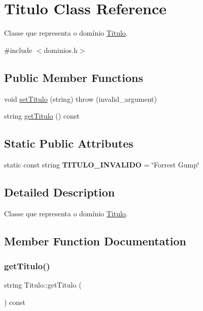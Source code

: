 \hypertarget{classTitulo}{}\section{Titulo Class Reference}
\label{classTitulo}


Classe que representa o domínio \hyperlink{classTitulo}{Titulo}.  




{\ttfamily \#include $<$dominios.\+h$>$}

\subsection*{Public Member Functions}
\begin{DoxyCompactItemize}
\item 
void \hyperlink{classTitulo_ac4b3e70d24f498a9085ae9d01d51ef12}{set\+Titulo} (string)  throw (invalid\+\_\+argument)
\item 
string \hyperlink{classTitulo_ad13d7166263fe5b8053532a820165390}{get\+Titulo} () const
\end{DoxyCompactItemize}
\subsection*{Static Public Attributes}
\begin{DoxyCompactItemize}
\item 
\mbox{\label{classTitulo_a3a7681b90e6c376085326ed8c8a065f5}} 
static const string {\bfseries T\+I\+T\+U\+L\+O\+\_\+\+I\+N\+V\+A\+L\+I\+DO} = \char`\"{}Forrest Gump\char`\"{}
\end{DoxyCompactItemize}


\subsection{Detailed Description}
Classe que representa o domínio \hyperlink{classTitulo}{Titulo}. 

\subsection{Member Function Documentation}
\mbox{\label{classTitulo_ad13d7166263fe5b8053532a820165390}} 
\subsubsection{\texorpdfstring{get\+Titulo()}{getTitulo()}}
{\footnotesize\ttfamily string Titulo\+::get\+Titulo (\begin{DoxyParamCaption}{ }\end{DoxyParamCaption}) const\hspace{0.3cm}{\ttfamily [inline]}}

